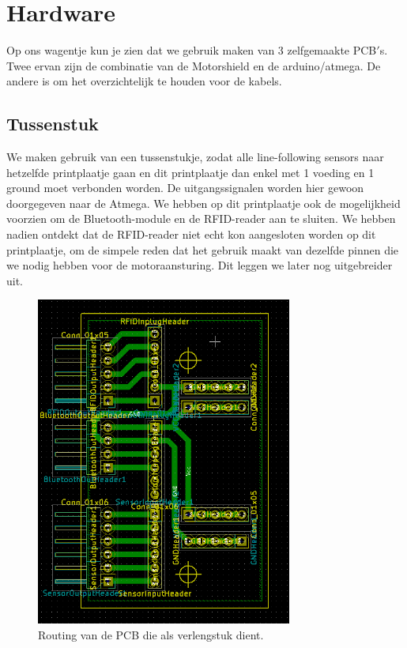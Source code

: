 \chapter{Hardware}
Op ons wagentje kun je zien dat we gebruik maken van 3 zelfgemaakte PCB$\prime$s. Twee ervan zijn de combinatie van de Motorshield en de arduino/atmega. De andere is om het overzichtelijk te houden voor de kabels.

\section{Tussenstuk}
We maken gebruik van een tussenstukje, zodat alle line-following sensors naar hetzelfde printplaatje gaan en dit printplaatje dan enkel met 1 voeding en 1 ground moet verbonden worden. De uitgangssignalen worden hier gewoon doorgegeven naar de Atmega. We hebben op dit printplaatje ook de mogelijkheid voorzien om de Bluetooth-module en de RFID-reader aan te sluiten. We hebben nadien ontdekt dat de RFID-reader niet echt kon aangesloten worden op dit printplaatje, om de simpele reden dat het gebruik maakt van dezelfde pinnen die we nodig hebben voor de motoraansturing. Dit leggen we later nog uitgebreider uit. \\
\begin{figure}[h]
\centering
\includegraphics[width=0.75\textwidth]{tussenstukPCB.PNG}
\caption{Routing van de PCB die als verlengstuk dient. \label{tussenstukPCB}}
\end{figure}
